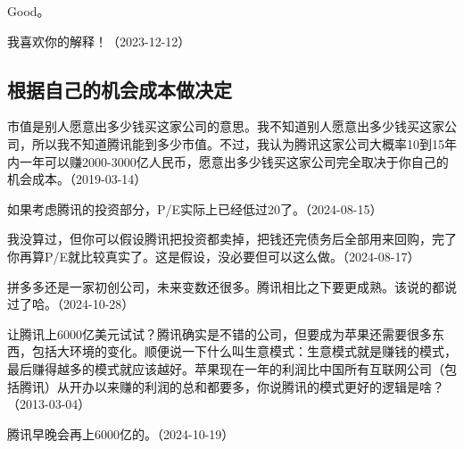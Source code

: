 Good。

我喜欢你的解释！（2023-12-12）

\subsection{根据自己的机会成本做决定}


市值是别人愿意出多少钱买这家公司的意思。我不知道别人愿意出多少钱买这家公司，所以我不知道腾讯能到多少市值。不过，我认为腾讯这家公司大概率10到15年内一年可以赚2000-3000亿人民币，愿意出多少钱买这家公司完全取决于你自己的机会成本。（2019-03-14）

如果考虑腾讯的投资部分，P/E实际上已经低过20了。（2024-08-15）


我没算过，但你可以假设腾讯把投资都卖掉，把钱还完债务后全部用来回购，完了你再算P/E就比较真实了。这是假设，没必要但可以这么做。（2024-08-17）

拼多多还是一家初创公司，未来变数还很多。腾讯相比之下要更成熟。该说的都说过了哈。（2024-10-28）


让腾讯上6000亿美元试试？腾讯确实是不错的公司，但要成为苹果还需要很多东西，包括大环境的变化。顺便说一下什么叫生意模式：生意模式就是赚钱的模式，最后赚得越多的模式就应该越好。苹果现在一年的利润比中国所有互联网公司（包括腾讯）从开办以来赚的利润的总和都要多，你说腾讯的模式更好的逻辑是啥？（2013-03-04）

腾讯早晚会再上6000亿的。（2024-10-19）

